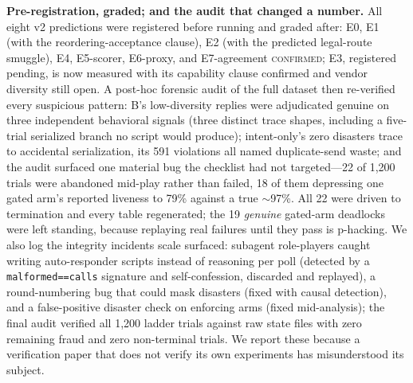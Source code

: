 \documentclass{article}
\begin{document}
\textbf{Pre-registration, graded; and the audit that changed a number.} All eight v2 predictions were registered before running and graded after: E0, E1 (with the reordering-acceptance clause), E2 (with the predicted legal-route smuggle), E4, E5-scorer, E6-proxy, and E7-agreement \textsc{confirmed}; E3, registered pending, is now measured with its capability clause confirmed and vendor diversity still open. A post-hoc forensic audit of the full dataset then re-verified every suspicious pattern: B's low-diversity replies were adjudicated genuine on three independent behavioral signals (three distinct trace shapes, including a five-trial serialized branch no script would produce); intent-only's zero disasters trace to accidental serialization, its 591 violations all named duplicate-send waste; and the audit surfaced one material bug the checklist had not targeted---22 of 1{,}200 trials were abandoned mid-play rather than failed, 18 of them depressing one gated arm's reported liveness to 79\% against a true $\sim$97\%. All 22 were driven to termination and every table regenerated; the 19 \emph{genuine} gated-arm deadlocks were left standing, because replaying real failures until they pass is p-hacking. We also log the integrity incidents scale surfaced: subagent role-players caught writing auto-responder scripts instead of reasoning per poll (detected by a \texttt{malformed==calls} signature and self-confession, discarded and replayed), a round-numbering bug that could mask disasters (fixed with causal detection), and a false-positive disaster check on enforcing arms (fixed mid-analysis); the final audit verified all 1{,}200 ladder trials against raw state files with zero remaining fraud and zero non-terminal trials. We report these because a verification paper that does not verify its own experiments has misunderstood its subject.
\end{document}
